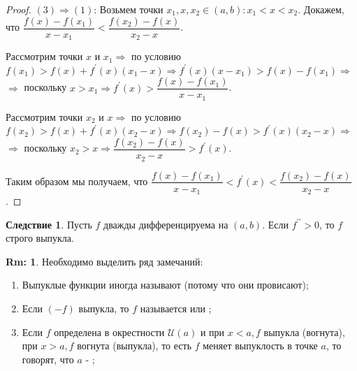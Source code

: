 \documentclass[12pt]{article}
\newcommand{\MU}{\mathcal{U}}
\theoremstyle{definition}
\newtheorem{rem}{Rm:}
\newtheorem{corollary}{Следствие}
\begin{document}
\begin{proof}
	$(3) \Rightarrow (1)$: Возьмем точки $x_1,x,x_2 \in (a,b) \colon x_1 < x < x_2$. Докажем, что $\dfrac{f(x) - f(x_1)}{x - x_1} < \dfrac{f(x_2) - f(x)}{x_2 - x}$.

	Рассмотрим точки $x$ и $x_1 \Rightarrow$ по условию $f(x_1) > f(x) + f^\prime(x)(x_1 - x) \Rightarrow f^\prime(x)(x - x_1) > f(x) - f(x_1) \Rightarrow$\\
	$\Rightarrow$ поскольку $x > x_1 \Rightarrow f^\prime(x) > \dfrac{f(x) - f(x_1)}{x - x_1}$.
	
	Рассмотрим точки $x_2$ и $x \Rightarrow$ по условию $f(x_2) > f(x) + f^\prime(x)(x_2 - x) \Rightarrow f(x_2) - f(x) > f^\prime(x)(x_2 - x) \Rightarrow$\\
	$\Rightarrow$ поскольку $x_2 > x \Rightarrow \dfrac{f(x_2) - f(x)}{x_2 - x} > f^\prime(x)$.	
	
	Таким образом мы получаем, что $\dfrac{f(x) - f(x_1)}{x - x_1} < f^\prime(x) < \dfrac{f(x_2) - f(x)}{x_2 - x}$.
\end{proof}

\begin{corollary}
	Пусть $f$ дважды дифференцируема на $(a,b)$. Если $f^{\prime\prime} > 0$, то $f$ строго выпукла.
\end{corollary}

\begin{rem}Необходимо выделить ряд замечаний:
	\begin{enumerate}[label={(\arabic*)}]
		\item Выпуклые функции иногда называют  (потому что они провисают);
		\item Если $(-f)$ выпукла, то $f$ называется  или ;
		\item Если $f$ определена в окрестности $\MU(a)$ и при $x< a, f$ выпукла (вогнута), при $x > a, f$ вогнута (выпукла), то есть $f$ меняет выпуклость в точке $a$, то говорят, что $a$ - ;
	\end{enumerate}
\end{rem}

\newpage
\end{document}
